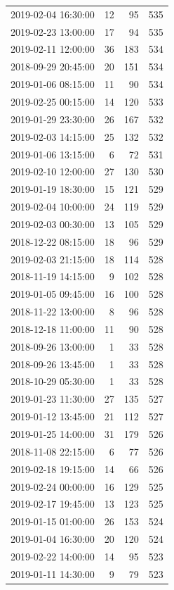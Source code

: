 \begin{tabular}{lrrr}
2019-02-04 16:30:00 & 12 & 95 & 535 \\
2019-02-23 13:00:00 & 17 & 94 & 535 \\
2019-02-11 12:00:00 & 36 & 183 & 534 \\
2018-09-29 20:45:00 & 20 & 151 & 534 \\
2019-01-06 08:15:00 & 11 & 90 & 534 \\
2019-02-25 00:15:00 & 14 & 120 & 533 \\
2019-01-29 23:30:00 & 26 & 167 & 532 \\
2019-02-03 14:15:00 & 25 & 132 & 532 \\
2019-01-06 13:15:00 & 6 & 72 & 531 \\
2019-02-10 12:00:00 & 27 & 130 & 530 \\
2019-01-19 18:30:00 & 15 & 121 & 529 \\
2019-02-04 10:00:00 & 24 & 119 & 529 \\
2019-02-03 00:30:00 & 13 & 105 & 529 \\
2018-12-22 08:15:00 & 18 & 96 & 529 \\
2019-02-03 21:15:00 & 18 & 114 & 528 \\
2018-11-19 14:15:00 & 9 & 102 & 528 \\
2019-01-05 09:45:00 & 16 & 100 & 528 \\
2018-11-22 13:00:00 & 8 & 96 & 528 \\
2018-12-18 11:00:00 & 11 & 90 & 528 \\
2018-09-26 13:00:00 & 1 & 33 & 528 \\
2018-09-26 13:45:00 & 1 & 33 & 528 \\
2018-10-29 05:30:00 & 1 & 33 & 528 \\
2019-01-23 11:30:00 & 27 & 135 & 527 \\
2019-01-12 13:45:00 & 21 & 112 & 527 \\
2019-01-25 14:00:00 & 31 & 179 & 526 \\
2018-11-08 22:15:00 & 6 & 77 & 526 \\
2019-02-18 19:15:00 & 14 & 66 & 526 \\
2019-02-24 00:00:00 & 16 & 129 & 525 \\
2019-02-17 19:45:00 & 13 & 123 & 525 \\
2019-01-15 01:00:00 & 26 & 153 & 524 \\
2019-01-04 16:30:00 & 20 & 120 & 524 \\
2019-02-22 14:00:00 & 14 & 95 & 523 \\
2019-01-11 14:30:00 & 9 & 79 & 523 \\

\end{tabular}

